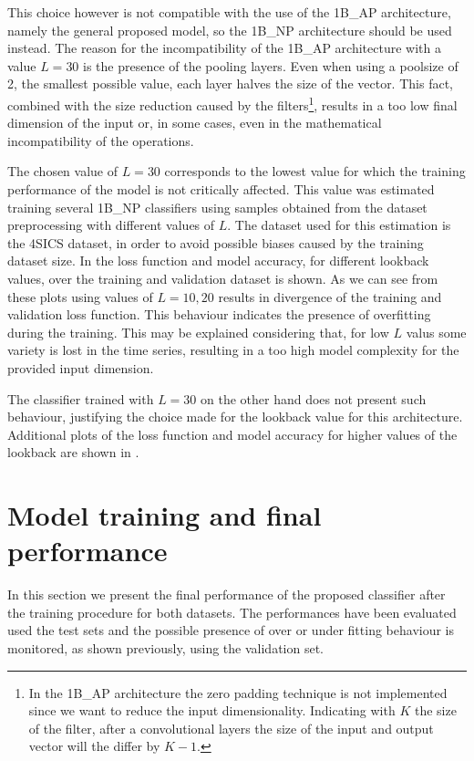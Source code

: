 This choice however is not compatible with the use of the 1B\_AP architecture, namely the general proposed model, so the 1B\_NP architecture should be used instead. The reason for the incompatibility of the 1B\_AP architecture with a value $L=30$ is the presence of the pooling layers. 
Even when using a poolsize of 2, the smallest possible value, each layer halves the size of the vector. This fact, combined with the size reduction caused by the filters\footnote{In the 1B\_AP architecture the zero padding technique is not implemented since we want to reduce the input dimensionality. Indicating with $K$ the size of the filter, after a convolutional layers the size of the input and output vector will the differ by $K-1$.}, results in a too low final dimension of the input or, in some cases, even in the mathematical incompatibility of the operations.

The chosen value of $L=30$ corresponds to the lowest value for which the training performance of the model is not critically affected. This value was estimated training several 1B\_NP classifiers using samples obtained from the dataset preprocessing with different values of $L$. The dataset used for this estimation is the 4SICS dataset, in order to avoid possible biases caused by the training dataset size. 
In  the loss function and model accuracy, for different lookback values, over the training and validation dataset is shown. As we can see from these plots  using values of $L=10,20$ results in divergence of the training and validation loss function. This behaviour indicates the presence of overfitting during the training. This may be explained considering that, for low $L$ valus some variety is lost in the time series, resulting in a too high model complexity for the provided input dimension.

The classifier trained with $L=30$ on the other hand does not present such behaviour, justifying the choice made for the lookback value for this architecture. Additional plots of the loss function and model accuracy for higher values of the lookback are shown in .





\section{Model training and final performance}\label{res_test}

In this section we present the final performance of the proposed classifier after the training procedure for both datasets. The performances have been evaluated used the test sets and the possible presence of over or under fitting behaviour is monitored, as shown previously, using the validation set.



